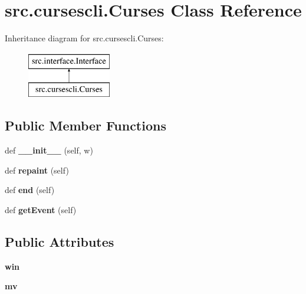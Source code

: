 \hypertarget{classsrc_1_1cursescli_1_1_curses}{}\section{src.\+cursescli.\+Curses Class Reference}
\label{classsrc_1_1cursescli_1_1_curses}
Inheritance diagram for src.\+cursescli.\+Curses\+:\begin{figure}[H]
\begin{center}
\leavevmode
\includegraphics[height=2.000000cm]{classsrc_1_1cursescli_1_1_curses}
\end{center}
\end{figure}
\subsection*{Public Member Functions}
\begin{DoxyCompactItemize}
\item 
\hypertarget{classsrc_1_1cursescli_1_1_curses_a209967b6a86c5764d17125f1429f2682}{}\label{classsrc_1_1cursescli_1_1_curses_a209967b6a86c5764d17125f1429f2682} 
def {\bfseries \+\_\+\+\_\+init\+\_\+\+\_\+} (self, w)
\item 
\hypertarget{classsrc_1_1cursescli_1_1_curses_a504362b12600063ae251aff3cfad1b00}{}\label{classsrc_1_1cursescli_1_1_curses_a504362b12600063ae251aff3cfad1b00} 
def {\bfseries repaint} (self)
\item 
\hypertarget{classsrc_1_1cursescli_1_1_curses_a8fcd62757832e9c7fed352d32d3782c6}{}\label{classsrc_1_1cursescli_1_1_curses_a8fcd62757832e9c7fed352d32d3782c6} 
def {\bfseries end} (self)
\item 
\hypertarget{classsrc_1_1cursescli_1_1_curses_a20567da929109704740e15c2f1c815bd}{}\label{classsrc_1_1cursescli_1_1_curses_a20567da929109704740e15c2f1c815bd} 
def {\bfseries get\+Event} (self)
\end{DoxyCompactItemize}
\subsection*{Public Attributes}
\begin{DoxyCompactItemize}
\item 
\hypertarget{classsrc_1_1cursescli_1_1_curses_a09c9716f40a3c2d0e93032186a027f06}{}\label{classsrc_1_1cursescli_1_1_curses_a09c9716f40a3c2d0e93032186a027f06} 
{\bfseries win}
\item 
\hypertarget{classsrc_1_1cursescli_1_1_curses_a76a27ba26310277dde3a72261ea9f951}{}\label{classsrc_1_1cursescli_1_1_curses_a76a27ba26310277dde3a72261ea9f951} 
{\bfseries mv}
\end{DoxyCompactItemize}


